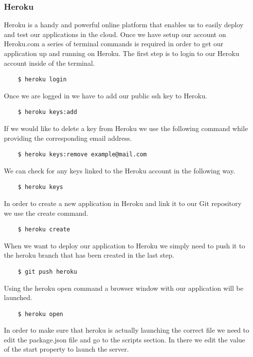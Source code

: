 \documentclass[11pt]{article}
\begin{document}
\subsubsection{Heroku}
Heroku is a handy and powerful online platform that enables us to easily deploy and test our applications in the cloud. Once we have setup our account on Heroku.com a series of terminal commands is required in order to get our application up and running on Heroku. The first step is to login to our Heroku account inside of the terminal. 

\begin{verbatim}
	$ heroku login
\end{verbatim}

Once we are logged in we have to add our public ssh key to Heroku.

\begin{verbatim}
	$ heroku keys:add
\end{verbatim}

If we would like to delete a key from Heroku we use the following command while providing the corresponding email address. 
\begin{verbatim}
	$ heroku keys:remove example@mail.com 
\end{verbatim}

We can check for any keys linked to the Heroku account in the following way.
\begin{verbatim}
	$ heroku keys 
\end{verbatim}

In order to create a new application in Heroku and link it to our Git repository we use the create command. 
\begin{verbatim}
	$ heroku create
\end{verbatim}

When we want to deploy our application to Heroku we simply need to push it to the heroku branch that has been created in the last step. 
\begin{verbatim}
	$ git push heroku
\end{verbatim}

Using the heroku open command a browser window with our application will be launched.
\begin{verbatim}
	$ heroku open
\end{verbatim}

In order to make sure that heroku is actually launching the correct file we need to edit the package.json file and go to the scripts section. In there we edit the value of the start property to launch the server. 
\end{document}
